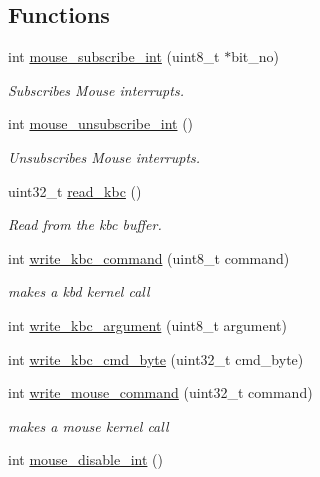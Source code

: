 \subsection*{Functions}
\begin{DoxyCompactItemize}
\item 
int \mbox{\hyperlink{group__mouse_ga9da18257ff113b686bb826d154bfaa87}{mouse\+\_\+subscribe\+\_\+int}} (uint8\+\_\+t $\ast$bit\+\_\+no)
\begin{DoxyCompactList}\small\item\em Subscribes Mouse interrupts. \end{DoxyCompactList}\item 
int \mbox{\hyperlink{group__mouse_ga685ad2706aca36d9869a30a19b9f446a}{mouse\+\_\+unsubscribe\+\_\+int}} ()
\begin{DoxyCompactList}\small\item\em Unsubscribes Mouse interrupts. \end{DoxyCompactList}\item 
uint32\+\_\+t \mbox{\hyperlink{group__mouse_gad82d7239d54c89cbccd5c7e8f742973d}{read\+\_\+kbc}} ()
\begin{DoxyCompactList}\small\item\em Read from the kbc buffer. \end{DoxyCompactList}\item 
int \mbox{\hyperlink{group__mouse_gac193b39c229dcec39b0d82bb9f242574}{write\+\_\+kbc\+\_\+command}} (uint8\+\_\+t command)
\begin{DoxyCompactList}\small\item\em makes a kbd kernel call \end{DoxyCompactList}\item 
int \mbox{\hyperlink{group__mouse_gaa581647856759c0789e39e87beb056c0}{write\+\_\+kbc\+\_\+argument}} (uint8\+\_\+t argument)
\item 
int \mbox{\hyperlink{group__mouse_gae71de5cc3d84045784f84fb32e0c4bd3}{write\+\_\+kbc\+\_\+cmd\+\_\+byte}} (uint32\+\_\+t cmd\+\_\+byte)
\item 
int \mbox{\hyperlink{group__mouse_ga26d0989b9acaa8dea02b2f0639916c0e}{write\+\_\+mouse\+\_\+command}} (uint32\+\_\+t command)
\begin{DoxyCompactList}\small\item\em makes a mouse kernel call \end{DoxyCompactList}\item 
int \mbox{\hyperlink{group__mouse_ga9b5d5366f7067f50586c03e9a3f000cd}{mouse\+\_\+disable\+\_\+int}} ()

\end{DoxyCompactItemize}
